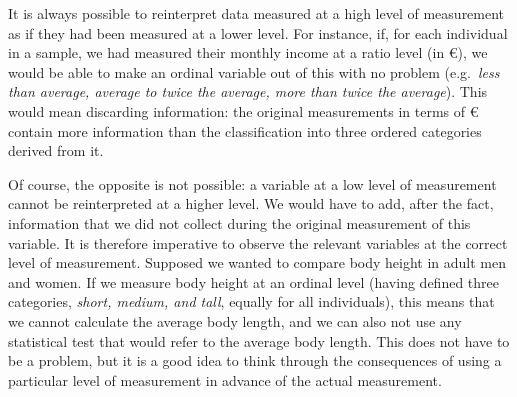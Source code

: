 \documentclass[
]{book}
\begin{document}
It is always possible to reinterpret data measured at a high level of measurement as if they had been measured at a lower level. For instance, if, for each individual in a sample, we had measured their monthly income at a ratio level (in €), we would be able to make an ordinal variable out of this with no problem (e.g.~\emph{less than average, average to twice the average, more than twice the average}). This would mean discarding information: the original measurements in terms of € contain more information than the classification into three ordered categories derived from it.

Of course, the opposite is not possible: a variable at a low level of measurement cannot be reinterpreted at a higher level. We would have to add, after the fact, information that we did not collect during the original measurement of this variable. It is therefore imperative to observe the relevant variables at the correct level of measurement. Supposed we wanted to compare body height in adult men and women. If we measure body height at an ordinal level (having defined three categories, \emph{short, medium, and tall}, equally for all individuals), this means that we cannot calculate the average body length, and we can also not use any statistical test that would refer to the average body length. This does not have to be a problem, but it is a good idea to think through the consequences of using a particular level of measurement in advance of the actual measurement.

  
\end{document}
